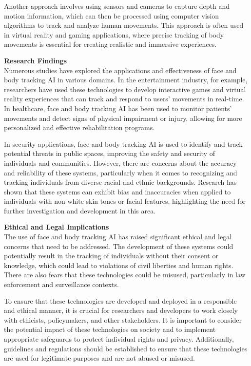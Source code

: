 Another approach involves using sensors and cameras to capture depth and motion information, which can then be 
processed using computer vision algorithms to track and analyze human movements. This approach is often used in 
virtual reality and gaming applications, where precise tracking of body movements is essential for creating 
realistic and immersive experiences.

\textbf{Research Findings} \\
Numerous studies have explored the applications and effectiveness of face and body tracking AI in various domains. 
In the entertainment industry, for example, researchers have used these technologies to develop interactive games 
and virtual reality experiences that can track and respond to users' movements in real-time. In healthcare, 
face and body tracking AI has been used to monitor patients' movements and detect signs of physical 
impairment or injury, allowing for more personalized and effective rehabilitation programs.

In security applications, face and body tracking AI is used to identify and track potential threats in public spaces, 
improving the safety and security of individuals and communities. However, there are concerns about the accuracy and 
reliability of these systems, particularly when it comes to recognizing and tracking individuals from diverse racial 
and ethnic backgrounds. Research has shown that these systems can exhibit bias and inaccuracies when applied to 
individuals with non-white skin tones or facial features, highlighting the need for further investigation and development in this area.

\textbf{Ethical and Legal Implications} \\
The use of face and body tracking AI has raised significant ethical and legal concerns that need to be addressed. 
The development of these systems could potentially result in the tracking of individuals without their consent or 
knowledge, which could lead to violations of civil liberties and human rights. There are also fears that these 
technologies could be misused, particularly in law enforcement and surveillance contexts.

To ensure that these technologies are developed and deployed in a responsible and ethical manner, it is 
crucial for researchers and developers to work closely with ethicists, policymakers, and other stakeholders. 
It is important to consider the potential impact of these technologies on society and to implement appropriate 
safeguards to protect individual rights and privacy. Additionally, guidelines and regulations should be 
established to ensure that these technologies are used for legitimate purposes and are not abused or misused.
